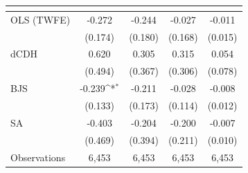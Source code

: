 {
\def\sym#1{\ifmmode^{#1}\else\(^{#1}\)\fi}
\begin{tabular}{l*{4}{c}}
\toprule
            &&&&\\
\midrule
OLS (TWFE) & -0.272 & -0.244 & -0.027 & -0.011 \\
             & (0.174) & (0.180) & (0.168) & (0.015) \\
dCDH & 0.620 & 0.305 & 0.315 & 0.054 \\
             & (0.494) & (0.367) & (0.306) & (0.078) \\
BJS & -0.239\sym{*} & -0.211 & -0.028 & -0.008 \\
             & (0.133) & (0.173) & (0.114) & (0.012) \\
SA & -0.403 & -0.204 & -0.200 & -0.007 \\
             & (0.469) & (0.394) & (0.211) & (0.010) \\
\midrule
Observations & 6,453 & 6,453 & 6,453 & 6,453 \\
\bottomrule
\end{tabular}
}
